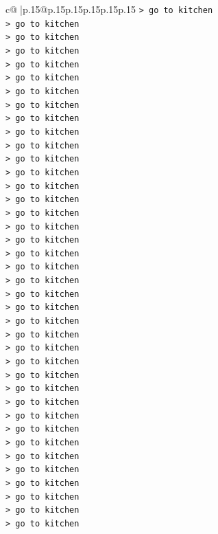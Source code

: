 \documentclass{article}
\begin{document}
{\begin{supertabular}{c@{$\;$}|p{.15\linewidth}@{}p{.15\linewidth}p{.15\linewidth}p{.15\linewidth}p{.15\linewidth}p{.15\linewidth}}
{{{\texttt{> go to kitchen} \\
\texttt{> go to kitchen} \\
\texttt{> go to kitchen} \\
\texttt{> go to kitchen} \\
\texttt{> go to kitchen} \\
\texttt{> go to kitchen} \\
\texttt{> go to kitchen} \\
\texttt{> go to kitchen} \\
\texttt{> go to kitchen} \\
\texttt{> go to kitchen} \\
\texttt{> go to kitchen} \\
\texttt{> go to kitchen} \\
\texttt{> go to kitchen} \\
\texttt{> go to kitchen} \\
\texttt{> go to kitchen} \\
\texttt{> go to kitchen} \\
\texttt{> go to kitchen} \\
\texttt{> go to kitchen} \\
\texttt{> go to kitchen} \\
\texttt{> go to kitchen} \\
\texttt{> go to kitchen} \\
\texttt{> go to kitchen} \\
\texttt{> go to kitchen} \\
\texttt{> go to kitchen} \\
\texttt{> go to kitchen} \\
\texttt{> go to kitchen} \\
\texttt{> go to kitchen} \\
\texttt{> go to kitchen} \\
\texttt{> go to kitchen} \\
\texttt{> go to kitchen} \\
\texttt{> go to kitchen} \\
\texttt{> go to kitchen} \\
\texttt{> go to kitchen} \\
\texttt{> go to kitchen} \\
\texttt{> go to kitchen} \\
\texttt{> go to kitchen} \\
\texttt{> go to kitchen} \\
\texttt{> go to kitchen} \\
\texttt{> go to kitchen} \\
}}}
\end{supertabular}}
\end{document}
